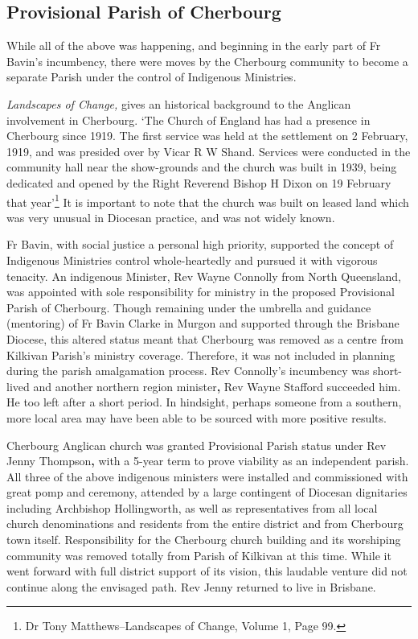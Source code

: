 \hypertarget{provisional-parish-of-cherbourg}{%
\subsection{Provisional Parish of Cherbourg}\label{provisional-parish-of-cherbourg}}

While all of the above was happening, and beginning in the early part of Fr Bavin's incumbency, there were moves by the Cherbourg community to become a separate Parish under the control of Indigenous Ministries.

\emph{Landscapes of Change,} gives an historical background to the Anglican involvement in Cherbourg. `The Church of England has had a presence in Cherbourg since 1919. The first service was held at the settlement on 2 February, 1919, and was presided over by Vicar R W Shand. Services were conducted in the community hall near the show-grounds and the church was built in 1939, being dedicated and opened by the Right Reverend Bishop H Dixon on 19 February that year'\footnote{Dr Tony Matthews--Landscapes of Change, Volume 1, Page 99.} It is important to note that the church was built on leased land which was very unusual in Diocesan practice, and was not widely known.

Fr Bavin, with social justice a personal high priority, supported the concept of Indigenous Ministries control whole-heartedly and pursued it with vigorous tenacity. An indigenous Minister, Rev Wayne Connolly from North Queensland, was appointed with sole responsibility for ministry in the proposed Provisional Parish of Cherbourg. Though remaining under the umbrella and guidance (mentoring) of Fr Bavin Clarke in Murgon and supported through the Brisbane Diocese, this altered status meant that Cherbourg was removed as a centre from Kilkivan Parish's ministry coverage. Therefore, it was not included in planning during the parish amalgamation process. Rev Connolly's incumbency was short-lived and another northern region minister\textbf{,} Rev Wayne Stafford succeeded him. He too left after a short period. In hindsight, perhaps someone from a southern, more local area may have been able to be sourced with more positive results.

Cherbourg Anglican church was granted Provisional Parish status under Rev Jenny Thompson\textbf{,} with a 5-year term to prove viability as an independent parish. All three of the above indigenous ministers were installed and commissioned with great pomp and ceremony, attended by a large contingent of Diocesan dignitaries including Archbishop Hollingworth, as well as representatives from all local church denominations and residents from the entire district and from Cherbourg town itself. Responsibility for the Cherbourg church building and its worshiping community was removed totally from Parish of Kilkivan at this time. While it went forward with full district support of its vision, this laudable venture did not continue along the envisaged path. Rev Jenny returned to live in Brisbane.

